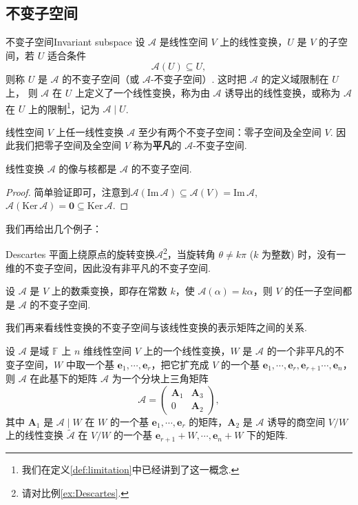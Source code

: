 \documentclass[12pt, a4paper,newtx]{ctexart}
\begin{document}
\subsection{不变子空间}
\begin{definition}{不变子空间}{Invariant subspace}\kaishu 
	设 $\mathcal{A}$ 是线性空间 $V$ 上的线性变换，$U$ 是 $V$ 的子空间，若 $U$ 适合条件
	\[
	\mathcal{A}(U) \subseteq U,
	\]
	则称 $U$ 是 $\mathcal{A}$ 的不变子空间（或 $\mathcal{A}$-不变子空间）. 这时把 $\mathcal{A}$ 的定义域{\heiti 限制}在 $U$ 上，
	则 $\mathcal{A}$ 在 $U$ 上定义了一个线性变换，称为由 $\mathcal{A}$ {\heiti 诱导}出的线性变换，或称为 $\mathcal{A}$ 在 $U$ 上的{\heiti 限制}\footnote{我们在定义\ref{def:limitation}中已经讲到了这一概念.}，记为 $\mathcal{A}\mid U$.
\end{definition}
线性空间 $V$ 上任一线性变换 $\mathcal{A}$ 至少有两个不变子空间：零子空间及全空间 $V$. 因此我们把零子空间及全空间 $V$ 称为\textbf{平凡}的 $\mathcal{A}$-不变子空间. 
\begin{proposition}{}{}
	线性变换 $\mathcal{A}$ 的像与核都是 $\mathcal{A}$ 的不变子空间. 
\end{proposition}
\begin{proof}
	简单验证即可，注意到$\mathcal{A}(\text{Im}\,\mathcal{A}) \subseteq \mathcal{A}(V) = \text{Im}\,\mathcal{A}$, $\mathcal{A}(\text{Ker}\,\mathcal{A}) = \bm 0 \subseteq \text{Ker}\,\mathcal{A}$.
\end{proof}
我们再给出几个例子：\begin{example}{}{}
	Descartes 平面上绕原点的旋转变换$\mathscr A$\footnote{请对比例\ref{ex:Descartes}.}，当旋转角 $\theta \neq k\pi$ ($k$ 为整数) 时，没有一维的不变子空间，因此没有非平凡的不变子空间.
\end{example}
\begin{example}{}{}
	设 $\mathcal{A}$ 是 $V$ 上的数乘变换，即存在常数 $k$，使 $\mathcal{A}(\alpha) = k\alpha$，则 $V$ 的任一子空间都是 $\mathcal{A}$ 的不变子空间.
\end{example}
我们再来看线性变换的不变子空间与该线性变换的表示矩阵之间的关系. 
\begin{theorem}{}{}
	设 $\mathcal{A}$ 是域 $\mathbb F$ 上 $n$ 维线性空间 $V$ 上的一个线性变换，$W$ 是 $\mathcal{A}$ 的一个非平凡的不变子空间，$W$ 中取一个基 $\bm{e}_1, \cdots, \bm{e}_r$，把它扩充成 $V$ 的一个基 $\bm{e}_1, \cdots, \bm{e}_r, \bm{e}_{r+1} \cdots, \bm{e}_n$，则 $\mathcal{A}$ 在此基下的矩阵 $\mathcal{A}$ 为一个分块上三角矩阵
	\[
	\mathcal{A} = \begin{pmatrix}
		\bm{A}_1 & \bm{A}_3 \\
		0 & \bm {A}_2
	\end{pmatrix},
	\]
	其中 $\bm{A}_1$ 是 $\mathcal{A}\mid W$ 在 $W$ 的一个基 $\bm{e}_1, \cdots, \bm{e}_r$ 的矩阵，$\bm{A}_2$ 是 $\mathcal A$ 诱导的商空间 $V/W$ 上的线性变换 $\widetilde{\mathcal{A}}$ 在 $V/W$ 的一个基 $\bm{e}_{r+1} + W, \cdots, \bm{e}_n + W$ 下的矩阵. 
\end{theorem}
\end{document}
